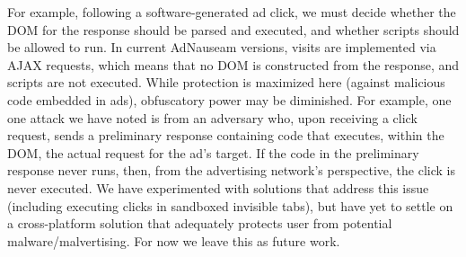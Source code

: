 \documentclass[conference]{IEEEtran}
\begin{document}
For example, following a software-generated ad click, we must decide whether the DOM for the response should be parsed and executed, and whether scripts should be allowed to run. In current AdNauseam versions, visits are implemented via AJAX requests, which means that no DOM is constructed from the response, and scripts are not executed. While protection is maximized here (against malicious code embedded in ads), obfuscatory power may be diminished. For example, one one attack we have noted is from an adversary who, upon receiving a click request, sends a preliminary response containing code that executes, within the DOM, the actual request for the ad's target. If the code in the preliminary response never runs, then, from the advertising network's perspective, the click is never executed. We have experimented with solutions that address this issue (including executing clicks in sandboxed invisible tabs), but have yet to settle on a cross-platform solution that adequately protects user from potential malware/malvertising. For now we leave this as future work.


\end{document}

